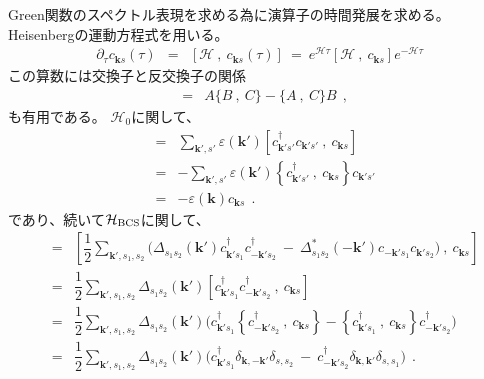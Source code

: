 \documentclass[a4j]{jsarticle}
\begin{document}
Green関数のスペクトル表現を求める為に演算子の時間発展を求める。
Heisenbergの運動方程式を用いる。
%
%
%
%
\begin{eqnarray}
	\partial_{\tau} c_{\bm{k}s} (\tau)
	&=&
	\left[ \mathcal{H} \ , \ c_{\bm{k}s}(\tau) \right]
	\ = \
	e^{\mathcal{H} \tau} \left[ \mathcal{H} \ , \ c_{\bm{k}s} \right] e^{- \mathcal{H} \tau}
\end{eqnarray}
%
%
%
%
この算数には交換子と反交換子の関係
%
%
%
%
\begin{eqnarray}
	[AB \ , \ C]
	&=&
	A \{ B \ , \ C \} - \{ A \ , \ C \} B
	\ \ ,
\end{eqnarray}
%
%
%
%
も有用である。
$\mathcal{H}_{0}$に関して、
%
%
%
%
\begin{eqnarray}
	[ \mathcal{H}_{0} \ , \ c_{\bm{k}s} ]
	&=&
	\sum_{\bm{k}',s'}
	\varepsilon(\bm{k}')
	\left[
		c_{\bm{k}' s'}^{\dagger}
		c_{\bm{k}' s'}
		\ , \
		c_{\bm{k}s}
		\right]
	\nonumber \\[2mm] &=&
	-
	\sum_{\bm{k}',s'}
	\varepsilon(\bm{k}')
	\left\{
	c_{\bm{k}' s'}^{\dagger}
	\ , \
	c_{\bm{k}s}
	\right\}
	c_{\bm{k}' s'}
	\nonumber \\[2mm] &=&
	-
	\varepsilon( \bm{k} )
	c_{\bm{k} s}
	\ \ .
\end{eqnarray}
%
%
%
%
であり、続いて$\mathcal{H}_{\rm BCS}$に関して、
%
%
%
%
\begin{eqnarray}
	[ \mathcal{H}_{\rm BCS} \ , \ c_{\bm{k}s} ]
	&=&
	\left[
		\dfrac{1}{2}
		\sum_{\bm{k}',s_{1},s_{2}}
		\Big(
		\Delta_{ s_{1} s_{2} }( \bm{k}' )
		c_{\bm{k}' s_{1}}^{\dagger}
		c_{-\bm{k}' s_{2}}^{\dagger}
		\ - \
		\Delta_{ s_{1} s_{2} }^{*}( - \bm{k}' )
		c_{-\bm{k}' s_{1}}
		c_{\bm{k}' s_{2}}
		\Big)
		\ , \
		c_{\bm{k}s}
		\right]
	\nonumber \\[2mm] &=&
	\dfrac{1}{2}
	\sum_{\bm{k}',s_{1},s_{2}}
	\Delta_{ s_{1} s_{2} }( \bm{k}' )
	\left[
		c_{\bm{k}' s_{1}}^{\dagger}
		c_{-\bm{k}' s_{2}}^{\dagger}
		\ , \
		c_{\bm{k}s}
		\right]
	\nonumber \\[2mm] &=&
	\dfrac{1}{2}
	\sum_{\bm{k}',s_{1},s_{2}}
	\Delta_{ s_{1} s_{2} }( \bm{k}' )
	\Big(
	c_{\bm{k}' s_{1}}^{\dagger}
	\left\{
	c_{-\bm{k}' s_{2}}^{\dagger}
	\ , \
	c_{\bm{k}s}
	\right\}
	-
	\left\{
	c_{\bm{k}' s_{1}}^{\dagger}
	\ , \
	c_{\bm{k}s}
	\right\}
	c_{-\bm{k}' s_{2}}^{\dagger}
	\Big)
	\nonumber \\[2mm] &=&
	\dfrac{1}{2}
	\sum_{\bm{k}',s_{1},s_{2}}
	\Delta_{ s_{1} s_{2} }( \bm{k}' )
	\Big(
	c_{\bm{k}' s_{1}}^{\dagger}
	\delta_{\bm{k},-\bm{k}'}
	\delta_{s,s_{2}}
	\ - \
	c_{-\bm{k}' s_{2}}^{\dagger}
	\delta_{\bm{k},\bm{k}'}
	\delta_{s,s_{1}}
	\Big)
	\ \ .
\end{eqnarray}
\end{document}
